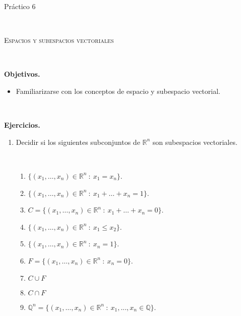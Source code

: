 \documentclass[12pt]{amsart}
\begin{document}
	
	
\centerline{\Large{Pr\' actico 6}}
	
\
	
\centerline{\textsc{Espacios y subespacios vectoriales}}
	
\
	
\noindent \textbf{Objetivos.} 
	
\begin{itemize}
\item Familiarizarse con los conceptos de espacio y subespacio vectorial.
\end{itemize}
	
	\
	
	\noindent \textbf{Ejercicios.} 
	
\begin{enumerate}

	

		
	\item Decidir si los siguientes subconjuntos de $\mathbb{R}^n$ son subespacios vectoriales.

\

	\begin{enumerate}
		\item $\{(x_1, \ldots ,x_n) \in \mathbb{R}^n \ : \ x_1 = x_n\}$.
		\item $\{(x_1, \ldots ,x_n) \in \mathbb{R}^n \ : \ x_1 +\dots + x_n=1\}$.
		\item $C=\{(x_1, \ldots ,x_n) \in \mathbb{R}^n \ : \ x_1 +\dots + x_n=0\}$.
		\item $\{(x_1, \ldots ,x_n) \in \mathbb{R}^n \ : \ x_1 \le x_2\}$.
		\item $\{(x_1, \ldots ,x_n) \in \mathbb{R}^n \ : \ x_n=1\}$.
		\item $F=\{(x_1, \ldots ,x_n) \in \mathbb{R}^n \ : \ x_n=0\}$.
		\item $C\cup F$
		\item $C\cap F$
		\item $\mathbb{Q}^n=\{(x_1, \ldots ,x_n) \in \mathbb{R}^n\ :\ x_1, ..., x_n\in\mathbb{Q}\}$.
	\end{enumerate}
		

\end{enumerate}
\end{document}
